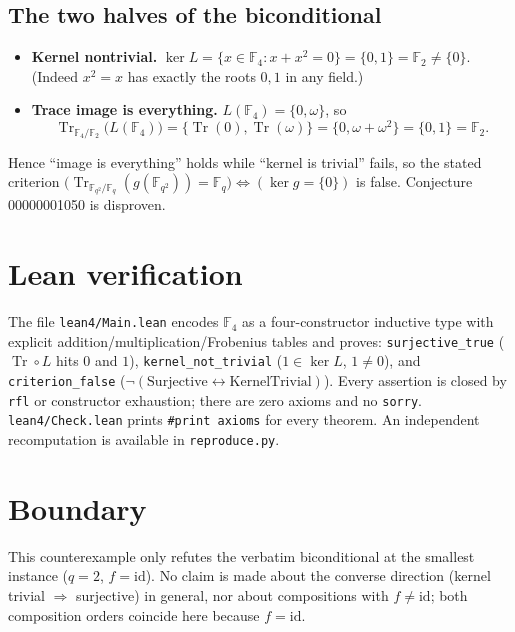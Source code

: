 \documentclass{article}
\begin{document}
\subsection{The two halves of the biconditional}

\begin{itemize}
\item \textbf{Kernel nontrivial.} $\ker L = \{x \in \mathbb{F}_4 : x + x^2 = 0\}
= \{0, 1\} = \mathbb{F}_2 \neq \{0\}$. (Indeed $x^2 = x$ has exactly the roots
$0, 1$ in any field.)
\item \textbf{Trace image is everything.} $L(\mathbb{F}_4) = \{0, \omega\}$, so
\[
\operatorname{Tr}_{\mathbb{F}_4/\mathbb{F}_2}\bigl(L(\mathbb{F}_4)\bigr)
= \{\operatorname{Tr}(0), \operatorname{Tr}(\omega)\}
= \{0, \omega + \omega^2\} = \{0, 1\} = \mathbb{F}_2 .
\]
\end{itemize}

Hence ``image is everything'' holds while ``kernel is trivial'' fails, so the
stated criterion
$\bigl(\operatorname{Tr}_{\mathbb{F}_{q^2}/\mathbb{F}_q}(g(\mathbb{F}_{q^2}))
= \mathbb{F}_q\bigr) \iff (\ker g = \{0\})$ is false. Conjecture 00000001050 is
disproven.

\section{Lean verification}

The file \texttt{lean4/Main.lean} encodes $\mathbb{F}_4$ as a four-constructor
inductive type with explicit addition/multiplication/Frobenius tables and proves:
\texttt{surjective\_true} ($\operatorname{Tr} \circ L$ hits $0$ and $1$),
\texttt{kernel\_not\_trivial} ($1 \in \ker L$, $1 \neq 0$), and
\texttt{criterion\_false} ($\neg(\text{Surjective} \leftrightarrow
\text{KernelTrivial})$). Every assertion is closed by \texttt{rfl} or constructor
exhaustion; there are zero axioms and no \texttt{sorry}. \texttt{lean4/Check.lean}
prints \texttt{\#print axioms} for every theorem.
An independent recomputation is available in \texttt{reproduce.py}.

\section{Boundary}

This counterexample only refutes the verbatim biconditional at the smallest
instance ($q=2$, $f = \mathrm{id}$). No claim is made about the converse direction
(kernel trivial $\Rightarrow$ surjective) in general, nor about compositions with
$f \neq \mathrm{id}$; both composition orders coincide here because $f=\mathrm{id}$.
\end{document}
